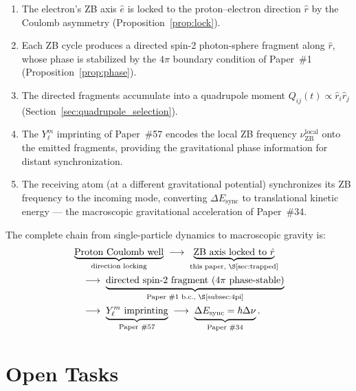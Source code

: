 \documentclass[%
 reprint, amsmath,amssymb, aps, prd, ]{revtex4-2}
\numberwithin{equation}{section}
\begin{document}
\begin{enumerate}[label=(\roman*), leftmargin=2em, itemsep=4pt]
\item The electron's ZB axis $\hat{e}$ is locked to the proton--electron direction $\hat{r}$ by the Coulomb asymmetry (Proposition~\ref{prop:lock}).
\item Each ZB cycle produces a directed spin-2 photon-sphere fragment along $\hat{r}$, whose phase is stabilized by the $4\pi$ boundary condition of Paper~\#1 (Proposition~\ref{prop:phase}).
\item The directed fragments accumulate into a quadrupole moment $Q_{ij}(t) \propto \hat{r}_i\hat{r}_j$ (Section~\ref{sec:quadrupole_selection}).
\item The $Y_\ell^m$ imprinting of Paper~\#57 encodes the local ZB frequency $\nu_\mathrm{ZB}^\mathrm{local}$ onto the emitted fragments, providing the gravitational phase information for distant synchronization.
\item The receiving atom (at a different gravitational potential) synchronizes its ZB frequency to the incoming mode, converting $\Delta E_\mathrm{sync}$ to translational kinetic energy --- the macroscopic gravitational acceleration of Paper~\#34.
\end{enumerate}

The complete chain from single-particle dynamics to macroscopic gravity is:
\begin{align}
&\underbrace{\text{Proton Coulomb well}}_{\text{direction locking}}
\;\longrightarrow\;
\underbrace{\text{ZB axis locked to }\hat{r}}_{\text{this paper, \S\ref{sec:trapped}}}
\notag\\
&\quad\longrightarrow\;
\underbrace{\text{directed spin-2 fragment ($4\pi$ phase-stable)}}_{\text{Paper \#1 b.c., \S\ref{subsec:4pi}}}
\notag\\
&\quad\longrightarrow\;
\underbrace{Y_\ell^m\text{ imprinting}}_{\text{Paper \#57}}
\;\longrightarrow\;
\underbrace{\Delta E_\mathrm{sync} = \hbar\Delta\nu}_{\text{Paper \#34}}.
\label{eq:full_chain}
\end{align}

\section{Open Tasks}
\label{sec:open}
\end{document}
